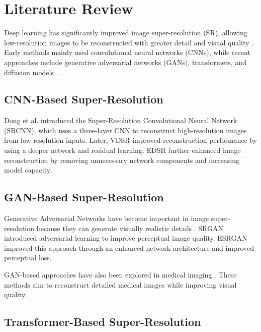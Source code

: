\documentclass[conference]{IEEEtran}
\begin{document}
\section{Literature Review}

Deep learning has significantly improved image super-resolution (SR), allowing low-resolution images to be reconstructed with greater detail and visual quality \cite{anwar2020survey, jiang2022research, han2022research, li2024survey}. Early methods mainly used convolutional neural networks (CNNs), while recent approaches include generative adversarial networks (GANs), transformers, and diffusion models \cite{zhang2025survey}.

\subsection{CNN-Based Super-Resolution}

Dong et al. \cite{dong2015srcnn} introduced the Super-Resolution Convolutional Neural Network (SRCNN), which uses a three-layer CNN to reconstruct high-resolution images from low-resolution inputs. Later, VDSR \cite{kim2016vdsr} improved reconstruction performance by using a deeper network and residual learning. EDSR \cite{lim2017edsr} further enhanced image reconstruction by removing unnecessary network components and increasing model capacity.

\subsection{GAN-Based Super-Resolution}

Generative Adversarial Networks have become important in image super-resolution because they can generate visually realistic details \cite{chauhan2023review}. SRGAN \cite{ledig2017srgan} introduced adversarial learning to improve perceptual image quality. ESRGAN \cite{wang2018esrgan} improved this approach through an enhanced network architecture and improved perceptual loss.

GAN-based approaches have also been explored in medical imaging \cite{zhu2019lfsr, ahmad2022multipath, zhang2022medsrnet, nandal2024realesrgan, aghelan2024realesrgan, yang2025msffgan}. These methods aim to reconstruct detailed medical images while improving visual quality.

\subsection{Transformer-Based Super-Resolution}
\end{document}
